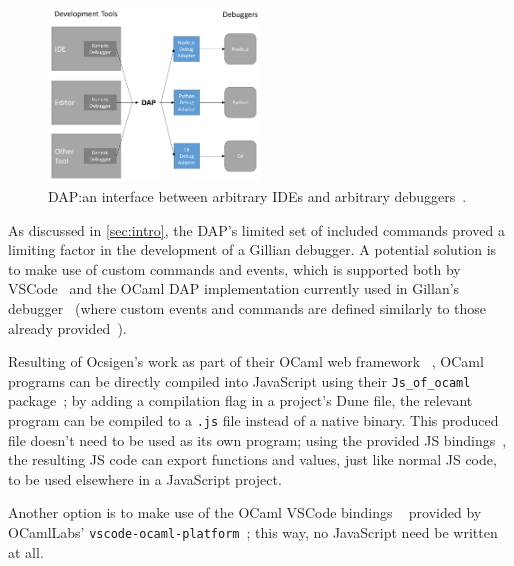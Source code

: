 \begin{figure}[!t]
  \centering
  \includegraphics[width=0.5\textwidth]{img/dap-diagram.png}
  \caption{
    DAP:\@ an interface between arbitrary IDEs and
    arbitrary debuggers~\cite{dap}.
  }\label{fig:dap-diagram}
\end{figure}

As discussed in \autoref{sec:intro}, the DAP's limited set of
included commands proved a limiting factor in the development of a Gillian
debugger. A potential solution is to make use of custom commands and events,
which is supported both by
VSCode~\cite{vscode-dap-custom-request, vscode-dap-custom-event} and the OCaml
DAP implementation currently used in Gillan's debugger~\cite{ocaml-dap} (where
custom events and commands are defined similarly to those already
provided~\cite{ocaml-dap-custom}).


Resulting of Ocsigen's work as part of their OCaml web framework
~\cite{ocsigen-framework}, OCaml programs can be directly compiled into
JavaScript using their \texttt{Js\_of\_ocaml} package~\cite{js-of-ocaml}; by
adding a compilation flag in a project's Dune file, the relevant program can be
compiled to a \texttt{.js} file instead of a native binary. This produced file
doesn't need to be used as its own program; using the provided JS
bindings~\cite{js-of-ocaml-bindings}, the resulting JS code can export
functions and values, just like normal JS code, to be used elsewhere in a
JavaScript project.

Another option is to make use of the OCaml VSCode bindings
~\cite{vscode-ocaml-bindings} provided by OCamlLabs'
\texttt{vscode-ocaml-platform}~\cite{vscode-ocaml-platform, ocamllabs}; this
way, no JavaScript need be written at all.

